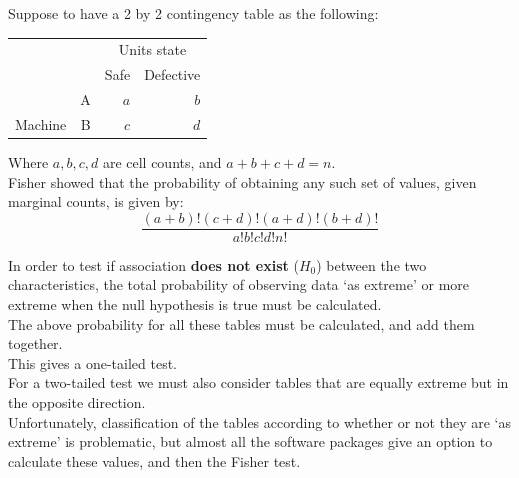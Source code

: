 \begin{frame}
  \vspace*{.25cm}
  Suppose to have a 2 by 2 contingency table as the following:\\
  \vspace*{.25cm}
  \begin{table}
    \begin{tabular}{|c|c|r|r|}
      \cline{3-4}
      \multicolumn{2}{c}{} & \multicolumn{2}{|c|}{Units state}\\ \cline{3-4}
      \multicolumn{2}{c}{} & \multicolumn{1}{|c|}{\hspace*{.25cm}Safe\hspace*{.25cm}} & \multicolumn{1}{|c|}{Defective}\\ \hline
      & \multicolumn{1}{|c|}{\hspace*{.5cm}A\hspace*{.5cm}} & \multicolumn{1}{|r|}{$a$} & \multicolumn{1}{|r|}{$b$}\\ \cline{2-4}
      \multicolumn{1}{|c|}{Machine} & \multicolumn{1}{|c|}{B} & \multicolumn{1}{|r|}{$c$} & \multicolumn{1}{|r|}{$d$}\\ 
    \hline
    \end{tabular}
  \end{table} 
  \vspace{.25cm}
  Where $a, b, c, d$ are cell counts, and $a + b + c + d=n$.\\
  \vspace{.25cm}
  Fisher showed that the probability of obtaining any such set of values, given marginal counts, is given by:
  $$\dfrac{(a+b)!(c+d)!(a+d)!(b+d)!}{a!b!c!d!n!}$$
\end{frame}


\begin{frame}
  \vspace*{.25cm}
  In order to test if association \textbf{does not exist} ($H_0$) between the two characteristics, the total probability of observing data `as extreme' or more extreme when the null hypothesis is true must be calculated.\\
 \vspace{.25cm}
  The above probability for all these tables must be calculated, and add them together. \\
 \vspace{.25cm}
  This gives a one-tailed test. \\
 \vspace{.25cm}
  For a two-tailed test we must also consider tables that are equally extreme but in the opposite direction. \\
 \vspace{.25cm}
  Unfortunately, classification of the tables according to whether or not they are `as extreme' is problematic, but almost all the software packages give an option to calculate these values, and then the Fisher test.\\
\end{frame}

